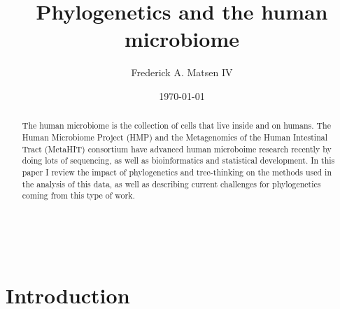 \documentclass{amsart}
\newcommand{\forarxiv}[1]{#1}
\newcommand{\notforarxiv}[1]{}
\begin{document}
\notforarxiv{
\begin{flushright}
Version dated: \today
\end{flushright}
\bigskip
\noindent RH: PHYLOGENETICS AND THE HUMAN MICROBIOME
\bigskip
\medskip
\begin{center}

\noindent{\Large \bf Phylogenetics and the human microbiome}
\bigskip

\noindent {\normalsize \sc
Frederick A. Matsen IV$^1$}\\
\noindent {\small \it
$^1$
Program in Computational Biology, Fred Hutchinson Cancer Research Center, Seattle, WA, 91802, USA}\\
\end{center}
\medskip
\noindent{\bf Corresponding author:} Frederick A Matsen, Program in Computational Biology, Fred Hutchinson Cancer Research Center, Seattle, WA, 91802, USA; E-mail: matsen@fhcrc.org.\\
\vspace{1in}
}

\forarxiv{\
\title{Phylogenetics and the human microbiome}
\author{Frederick A. Matsen IV}
\date{\today}
\begin{abstract}
}
\notforarxiv{
\subsubsection{Abstract}
}

The human microbiome is the collection of cells that live inside and on humans.
The Human Microbiome Project (HMP) and the Metagenomics of the Human Intestinal Tract (MetaHIT) consortium have advanced human microboime research recently by doing lots of sequencing, as well as bioinformatics and statistical development.
In this paper I review the impact of phylogenetics and tree-thinking on the methods used in the analysis of this data, as well as describing current challenges for phylogenetics coming from this type of work.

\forarxiv{
\end{abstract}
\maketitle

\section{Introduction}
}

\notforarxiv{
\noindent (Keywords: human microbiome; microbial ecology; zzz)\\
\vspace{1.5in}
}
\end{document}
